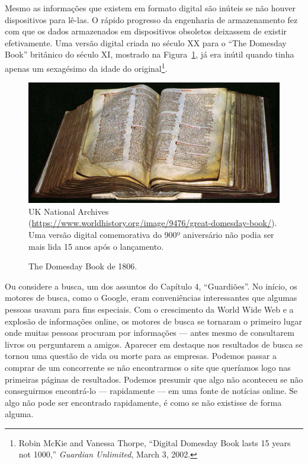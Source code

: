 Mesmo as informações que existem em formato digital são inúteis se não houver 
dispositivos para lê-las. O rápido progresso da engenharia de armazenamento fez 
com que os dados armazenados em dispositivos obsoletos deixassem de existir 
efetivamente. Uma versão digital criada no século XX para o ``The Domesday Book''
britânico do século XI, mostrado na Figura~\ref{fig:domesday}, já era inútil
quando tinha apenas um sexagésimo da idade do original\footnote{Robin McKie and
Vanessa Thorpe, ``Digital Domesday Book lasts 15 years not 1000,''
\textit{Guardian Unlimited}, March 3, 2002.}.

\begin{figure}[h]
\centering
\caption{The Domesday Book de 1806.}
\label{fig:domesday}
\vspace{-0.3cm}
\includegraphics[scale=0.5]{imagens/domesday.jpg}
\\
\scriptsize{UK National Archives
(\url{https://www.worldhistory.org/image/9476/great-domesday-book/}). Uma versão
digital comemorativa do 900º aniversário não podia ser mais lida 15 anos após
o lançamento.}
\end{figure}

Ou considere a busca, um dos assuntos do Capítulo 4, ``Guardiões''. No início,
os motores de busca, como o Google, eram conveniências interessantes que algumas
pessoas usavam para fins especiais. Com o crescimento da World Wide Web e a 
explosão de informações online, os motores de busca se tornaram o primeiro lugar 
onde muitas pessoas procuram por informações --- antes mesmo de consultarem
livros ou perguntarem a amigos. Aparecer em destaque nos resultados de busca se
tornou uma questão de vida ou morte para as empresas. Podemos passar a comprar 
de um concorrente se não encontrarmos o site que queríamos logo nas primeiras 
páginas de resultados. Podemos presumir que algo não aconteceu se não 
conseguirmos encontrá-lo --- rapidamente --- em uma fonte de notícias online.
Se algo não pode ser encontrado rapidamente, é como se não existisse de forma
alguma.

